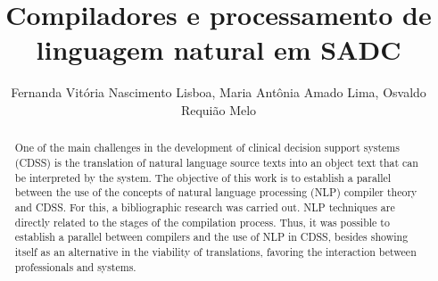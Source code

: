 \documentclass[12pt]{article}
\title{Compiladores e processamento de linguagem natural em SADC}
\author{Fernanda Vitória Nascimento Lisboa\inst{1}, Maria Antônia Amado Lima\inst{1}, Osvaldo Requião Melo\inst{2} }
\begin{document}
 

\maketitle

\begin{abstract}
One of the main challenges in the development of clinical decision support systems (CDSS) is the translation of natural language source texts into an object text that can be interpreted by the system. The objective of this work is to establish a parallel between the use of the concepts of natural language processing (NLP) compiler theory and CDSS. For this, a bibliographic research was carried out. NLP techniques are directly related to the stages of the compilation process. Thus, it was possible to establish a parallel between compilers and the use of NLP in CDSS, besides showing itself as an alternative in the viability of translations, favoring the interaction between professionals and systems.
\end{abstract}
     
\end{document}
